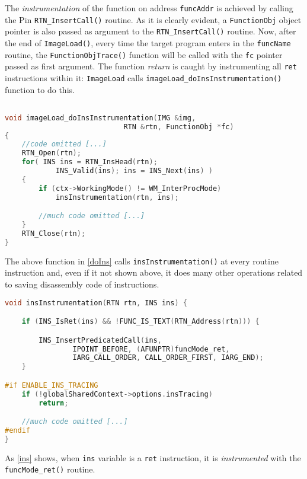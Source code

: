 \documentclass[a4paper,10pt]{report}
\begin{document}
\noindent
The \emph{instrumentation} of the function on address \verb|funcAddr| is achieved
by calling the Pin \verb|RTN_InsertCall()| routine.
As it is clearly evident, a \verb|FunctionObj| object pointer is also passed as
argument to the \verb|RTN_InsertCall()| routine.
Now, after the end of \verb|ImageLoad()|, every time the target program
enters in the \verb|funcName| routine, the \verb|FunctionObjTrace()| function
will be called with the \verb|fc| pointer passed as first argument.
The function \emph{return} is caught by instrumenting all \verb|ret| instructions
within it: \verb|ImageLoad| calls \verb|imageLoad_doInsInstrumentation()| function
to do this.

\begin{lstlisting}[language=C++,
	caption={a fragment of \texttt{imageLoad\_doInsInstrumentation()} routine},
	label=doIns, frame=leftline]

void imageLoad_doInsInstrumentation(IMG &img,
							RTN &rtn, FunctionObj *fc)
{
	//code omitted [...]
	RTN_Open(rtn);
	for( INS ins = RTN_InsHead(rtn);
			INS_Valid(ins); ins = INS_Next(ins) )
	{
		if (ctx->WorkingMode() != WM_InterProcMode)
			insInstrumentation(rtn, ins);

		//much code omitted [...]
	}
	RTN_Close(rtn);
}
\end{lstlisting}

\noindent
The above function in \cref{doIns} calls \verb|insInstrumentation()| at every routine instruction and, even if it not shown above, it does many other operations
related to saving disassembly code of instructions.

\begin{lstlisting}[language=C++,
	caption={a fragment of \texttt{insInstrumentation()} routine},
	label=ins, frame=leftline]
void insInstrumentation(RTN rtn, INS ins) {

	if (INS_IsRet(ins) && !FUNC_IS_TEXT(RTN_Address(rtn))) {

		INS_InsertPredicatedCall(ins,
				IPOINT_BEFORE, (AFUNPTR)funcMode_ret,
				IARG_CALL_ORDER, CALL_ORDER_FIRST, IARG_END);
	}

#if ENABLE_INS_TRACING
	if (!globalSharedContext->options.insTracing)
		return;

	//much code omitted [...]
#endif
}

\end{lstlisting}

\noindent
As \cref{ins} shows, when \verb|ins| variable is a \verb|ret| instruction,
it is \emph{instrumented} with the \verb|funcMode_ret()| routine.
\end{document}
